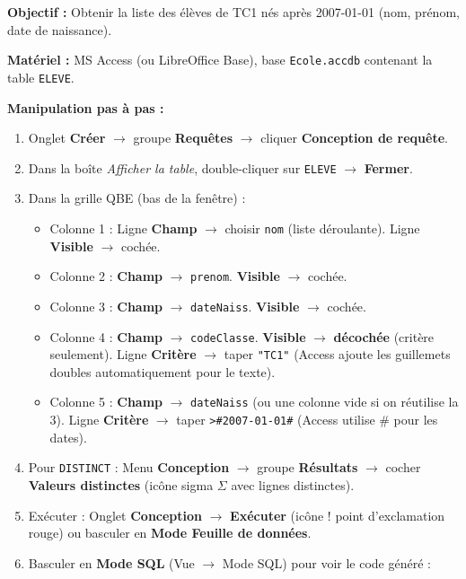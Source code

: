 \documentclass[11pt]{article}
\begin{document}
\begin{experience}
\textbf{Objectif :} Obtenir la liste des élèves de TC1 nés après 2007-01-01 (nom, prénom, date de naissance).

\textbf{Matériel :} MS Access (ou LibreOffice Base), base \texttt{Ecole.accdb} contenant la table \texttt{ELEVE}.

\textbf{Manipulation pas à pas :}
\begin{enumerate}
    \item Onglet \textbf{Créer} $\rightarrow$ groupe \textbf{Requêtes} $\rightarrow$ cliquer \textbf{Conception de requête}.
    \item Dans la boîte \emph{Afficher la table}, double-cliquer sur \texttt{ELEVE} $\rightarrow$ \textbf{Fermer}.
    \item Dans la grille QBE (bas de la fenêtre) :
    \begin{itemize}
        \item Colonne 1 : Ligne \textbf{Champ} $\rightarrow$ choisir \texttt{nom} (liste déroulante). Ligne \textbf{Visible} $\rightarrow$ cochée.
        \item Colonne 2 : \textbf{Champ} $\rightarrow$ \texttt{prenom}. \textbf{Visible} $\rightarrow$ cochée.
        \item Colonne 3 : \textbf{Champ} $\rightarrow$ \texttt{dateNaiss}. \textbf{Visible} $\rightarrow$ cochée.
        \item Colonne 4 : \textbf{Champ} $\rightarrow$ \texttt{codeClasse}. \textbf{Visible} $\rightarrow$ \textbf{décochée} (critère seulement). Ligne \textbf{Critère} $\rightarrow$ taper \texttt{"TC1"} (Access ajoute les guillemets doubles automatiquement pour le texte).
        \item Colonne 5 : \textbf{Champ} $\rightarrow$ \texttt{dateNaiss} (ou une colonne vide si on réutilise la 3). Ligne \textbf{Critère} $\rightarrow$ taper \texttt{>\#2007-01-01\#} (Access utilise \# pour les dates).
    \end{itemize}
    \item Pour \texttt{DISTINCT} : Menu \textbf{Conception} $\rightarrow$ groupe \textbf{Résultats} $\rightarrow$ cocher \textbf{Valeurs distinctes} (icône sigma $\Sigma$ avec lignes distinctes).
    \item Exécuter : Onglet \textbf{Conception} $\rightarrow$ \textbf{Exécuter} (icône ! point d'exclamation rouge) ou basculer en \textbf{Mode Feuille de données}.
    \item Basculer en \textbf{Mode SQL} (Vue $\rightarrow$ Mode SQL) pour voir le code généré :
\end{enumerate}


\end{experience}
\end{document}

